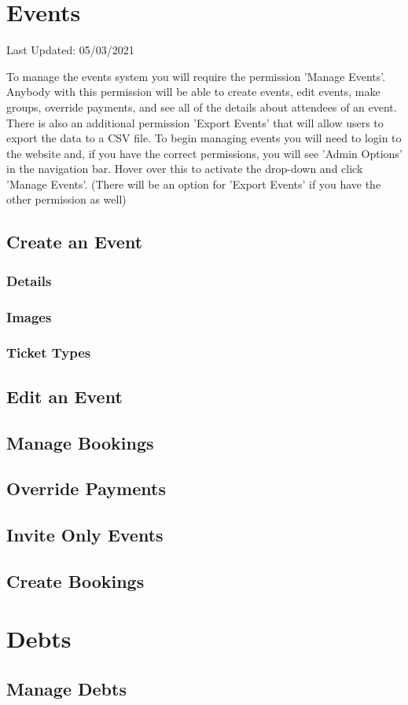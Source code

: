 \documentclass{article}
\begin{document}
\newpage
\section{Events}
Last Updated: 05/03/2021

To manage the events system you will require the permission 'Manage Events'. Anybody with this permission will be able to create events, edit events, make groups, override payments, and see all of the details about attendees of an event. There is also an additional permission 'Export Events' that will allow users to export the data to a CSV file. To begin managing events you will need to login to the website and, if you have the correct permissions, you will see 'Admin Options' in the navigation bar. Hover over this to activate the drop-down and click 'Manage Events'. (There will be an option for 'Export Events' if you have the other permission as well)

\subsection{Create an Event}
\subsubsection{Details}
\subsubsection{Images}
\subsubsection{Ticket Types}
\subsection{Edit an Event}
\subsection{Manage Bookings}
\subsection{Override Payments}
\subsection{Invite Only Events}
\subsection{Create Bookings}

\newpage
\section{Debts}
\subsection{Manage Debts}
\end{document}
